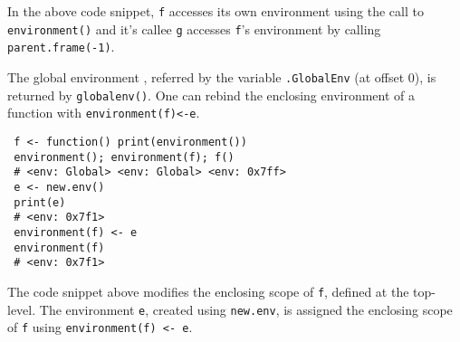 \documentclass[10pt,review,sigplan,authorversion=true]{acmart}
\newcommand{\code}[1]{\lstinline |#1|\xspace}
\renewcommand{\c}[1]{\lstinline |#1|\xspace}
\begin{document}
\noindent
In the above code snippet, \c{f} accesses its own environment using the call to
\c{environment()} and it's callee \c{g} accesses \c{f}'s environment by calling
\c{parent.frame(-1)}.

The global environment , referred by the variable \code{.GlobalEnv} (at offset
0), is returned by \code{globalenv()}. One can rebind the enclosing environment
of a function with \code{environment(f)<-e}.

\begin{lstlisting}
 f <- function() print(environment())
 environment(); environment(f); f()
 # <env: Global> <env: Global> <env: 0x7ff>
 e <- new.env()
 print(e)
 # <env: 0x7f1>
 environment(f) <- e
 environment(f)
 # <env: 0x7f1>
\end{lstlisting}

The code snippet above modifies the enclosing scope of \c{f}, defined at the
top-level. The environment \c{e}, created using \c{new.env}, is assigned the
enclosing scope of \c{f} using \c{environment(f) <- e}.
\end{document}
